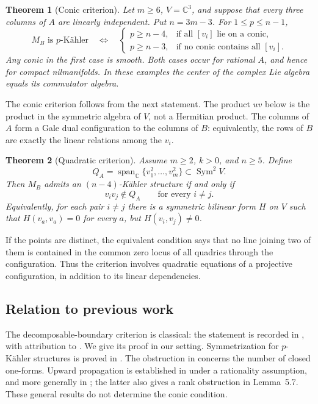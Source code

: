 \documentclass[12pt]{amsart}
\newcommand{\thmword}{Theorem}
\newtheorem{thm}{\thmword}[section]
\theoremstyle{definition}
\theoremstyle{remark}
\numberwithin{equation}{section}
\DeclareMathOperator{\Sym}{Sym}
\newcommand{\C}{\mathbb{C}}
\begin{document}
\begin{thm}[Conic criterion]\label{en:conic}
Let $m\geq6$, $V=\C^3$, and suppose that every three columns of $A$ are
linearly independent. Put $n=3m-3$. For $1\leq p\leq n-1$,
\[
 M_B\text{ is }p\text{-K\"ahler}
 \quad\Longleftrightarrow\quad
 \begin{cases}
 p\geq n-4,&\text{if all }[v_i]\text{ lie on a conic},\\
 p\geq n-3,&\text{if no conic contains all }[v_i].
 \end{cases}
\]
Any conic in the first case is smooth. Both cases occur for rational $A$,
and hence for compact nilmanifolds. In these examples the center of the
complex Lie algebra equals its commutator algebra.
\end{thm}

The conic criterion follows from the next statement. The product $uv$ below
is the product in the symmetric algebra of $V$, not a Hermitian product.
The columns of $A$ form a Gale dual configuration to the columns of $B$:
equivalently, the rows of $B$ are exactly the linear relations among the $v_i$.

\begin{thm}[Quadratic criterion]\label{en:quadratic}
Assume $m\geq2$, $k>0$, and $n\geq5$. Define
\[
 Q_A=\operatorname{span}_{\C}\{v_1^2,\ldots,v_m^2\}
       \subset\Sym^2 V.
\]
Then $M_B$ admits an $(n-4)$-K\"ahler structure if and only if
\begin{equation}\label{en:quadratic-test}
 v_i v_j\notin Q_A\qquad\text{for every }i\ne j.
\end{equation}
Equivalently, for each pair $i\ne j$ there is a symmetric bilinear form $H$
on $V$ such that $H(v_a,v_a)=0$ for every $a$, but $H(v_i,v_j)\ne0$.
\end{thm}

If the points are distinct, the equivalent condition says that no line joining
two of them is contained in the common zero locus of all quadrics through
the configuration. Thus the criterion involves quadratic equations of a
projective configuration, in addition to its linear dependencies.

\subsection*{Relation to previous work}
The decomposable-boundary criterion is classical: the statement is recorded
in \cite[Proposition~2.15]{en:LGM26}, with attribution to
\cite[Theorem~3.2]{en:AB91}. We give its proof in our setting.
Symmetrization for $p$-K\"ahler structures is proved in
\cite[Lemma~2.4]{en:FM24}. The obstruction in
\cite[Theorem~2.3]{en:ST22} concerns the number of closed one-forms.
Upward propagation is established in \cite[Theorem~4.1, preprint version]{en:LG25}
under a rationality assumption, and more generally in
\cite[Theorem~5.4]{en:LGM26}; the latter also gives a rank obstruction
in Lemma~5.7. These general results do not determine the conic condition.
\end{document}
